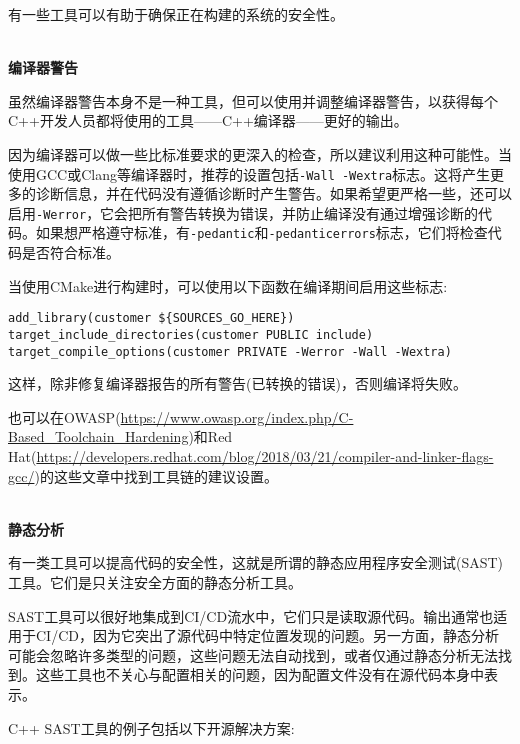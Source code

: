 有一些工具可以有助于确保正在构建的系统的安全性。

\hspace*{\fill} \\ %
\noindent
\textbf{编译器警告}

虽然编译器警告本身不是一种工具，但可以使用并调整编译器警告，以获得每个C++开发人员都将使用的工具——C++编译器——更好的输出。

因为编译器可以做一些比标准要求的更深入的检查，所以建议利用这种可能性。当使用GCC或Clang等编译器时，推荐的设置包括\texttt{-Wall -Wextra}标志。这将产生更多的诊断信息，并在代码没有遵循诊断时产生警告。如果希望更严格一些，还可以启用\texttt{-Werror}，它会把所有警告转换为错误，并防止编译没有通过增强诊断的代码。如果想严格遵守标准，有\texttt{-pedantic}和\texttt{-pedanticerrors}标志，它们将检查代码是否符合标准。

当使用CMake进行构建时，可以使用以下函数在编译期间启用这些标志:

\begin{lstlisting}[style=styleCMake]
add_library(customer ${SOURCES_GO_HERE})
target_include_directories(customer PUBLIC include)
target_compile_options(customer PRIVATE -Werror -Wall -Wextra)
\end{lstlisting}

这样，除非修复编译器报告的所有警告(已转换的错误)，否则编译将失败。

也可以在OWASP(\url{https://www.owasp.org/index.php/C-Based\_Toolchain\_Hardening})和Red Hat(\url{https://developers.redhat.com/blog/2018/03/21/compiler-and-linker-flags-gcc/})的这些文章中找到工具链的建议设置。

\hspace*{\fill} \\ %
\noindent
\textbf{静态分析}

有一类工具可以提高代码的安全性，这就是所谓的静态应用程序安全测试(SAST)工具。它们是只关注安全方面的静态分析工具。

SAST工具可以很好地集成到CI/CD流水中，它们只是读取源代码。输出通常也适用于CI/CD，因为它突出了源代码中特定位置发现的问题。另一方面，静态分析可能会忽略许多类型的问题，这些问题无法自动找到，或者仅通过静态分析无法找到。这些工具也不关心与配置相关的问题，因为配置文件没有在源代码本身中表示。

C++ SAST工具的例子包括以下开源解决方案:

